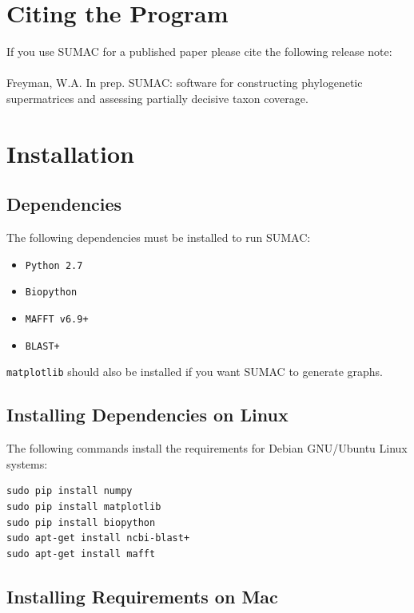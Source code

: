 \documentclass[10pt]{report}
\begin{document}
\section{Citing the Program}

If you use SUMAC for a published paper please cite the following release note: \\
\\
Freyman, W.A. In prep. SUMAC: software for constructing phylogenetic supermatrices and assessing partially decisive taxon coverage.

\section{Installation}

\subsection{Dependencies}

The following dependencies must be installed to run SUMAC:

\begin{itemize}
\item \texttt{Python 2.7}
\item \texttt{Biopython}
\item \texttt{MAFFT v6.9+}
\item \texttt{BLAST+}
\end{itemize}

\texttt{matplotlib} should also be installed if you want SUMAC to generate graphs.

\subsection{Installing Dependencies on Linux}

The following commands install the requirements for Debian GNU/Ubuntu Linux systems:

\begin{verbatim}
sudo pip install numpy
sudo pip install matplotlib
sudo pip install biopython
sudo apt-get install ncbi-blast+
sudo apt-get install mafft
\end{verbatim}

\subsection{Installing Requirements on Mac}
\end{document}
